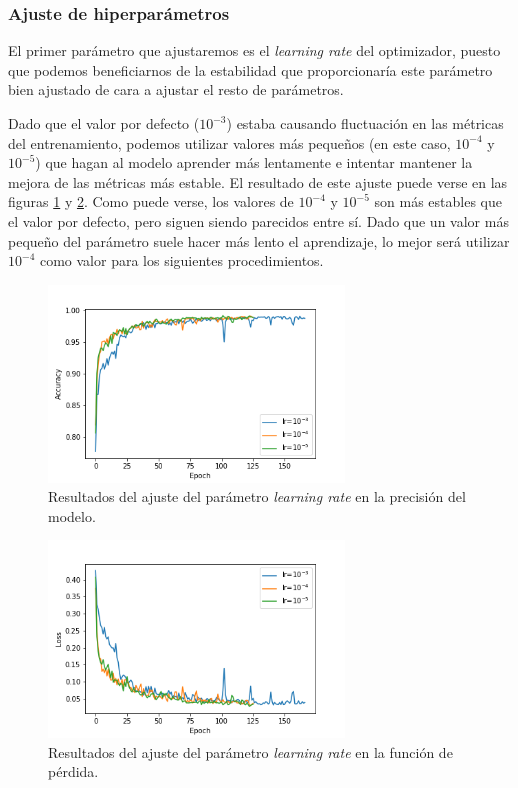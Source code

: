 \subsubsection*{Ajuste de hiperparámetros}

El primer parámetro que ajustaremos es el \textit{learning rate} del optimizador, puesto que podemos beneficiarnos de la estabilidad que proporcionaría este parámetro bien ajustado de cara a ajustar el resto de parámetros.

Dado que el valor por defecto ($10^{-3}$) estaba causando fluctuación en las métricas del entrenamiento, podemos utilizar valores más pequeños (en este caso, $10^{-4}$ y $10^{-5}$) que hagan al modelo aprender más lentamente e intentar mantener la mejora de las métricas más estable. El resultado de este ajuste puede verse en las figuras \ref{fig:lr_acc} y \ref{fig:lr_loss}. Como puede verse, los valores de $10^{-4}$ y $10^{-5}$ son más estables que el valor por defecto, pero siguen siendo parecidos entre sí. Dado que un valor más pequeño del parámetro suele hacer más lento el aprendizaje, lo mejor será utilizar $10^{-4}$ como valor para los siguientes procedimientos.

\begin{figure}[H]
  \centering
  \includegraphics[width=0.7\textwidth]{images/lr_acc.png}
  \caption{Resultados del ajuste del parámetro \textit{learning rate} en la precisión del modelo.}
  \label{fig:lr_acc}
\end{figure}

\begin{figure}[H]
  \centering
  \includegraphics[width=0.7\textwidth]{images/lr_loss}
  \caption{Resultados del ajuste del parámetro \textit{learning rate} en la función de pérdida.}
  \label{fig:lr_loss}
\end{figure}

